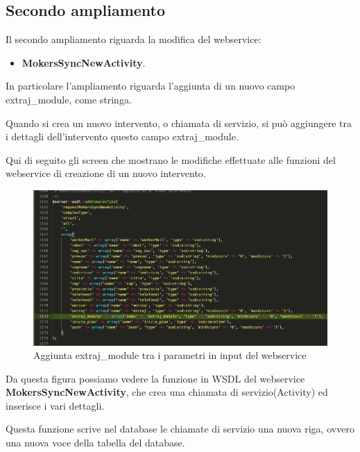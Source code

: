 \subsection{Secondo ampliamento}
Il secondo ampliamento riguarda la modifica del webservice:
\begin{itemize}
	\item \textbf{MokersSyncNewActivity}.
\end{itemize}
\begin{flushleft}
	In particolare l'ampliamento riguarda l'aggiunta di un nuovo campo extraj\_module, come  stringa.
	
	Quando si crea un nuovo intervento, o chiamata di servizio, si può aggiungere tra i dettagli dell'intervento questo campo extraj\_module.
	
	Qui di seguito gli screen che mostrano le modifiche effettuate alle funzioni del webservice di creazione di un nuovo intervento.
\end{flushleft}
\newspace
\begin{figure}[!h] 
	\centering
	\includegraphics[scale = 0.4]{immagini/webservices/ampliamenti/2ampl_prototipo_types.png}
	\caption{Aggiunta extraj\_module tra i parametri in input del webservice}
\end{figure}
\newspace
\begin{flushleft}
	Da questa figura possiamo vedere la funzione in WSDL del webservice \textbf{MokersSyncNewActivity}, che crea una chiamata di servizio(Activity) ed inserisce i vari dettagli. 
	
	Questa funzione scrive nel database le chiamate di servizio una nuova riga, ovvero una nuova voce della tabella del database.
\end{flushleft}

\newpage

